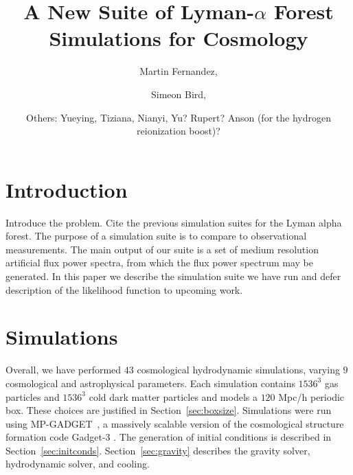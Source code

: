 \documentclass[a4paper,11pt]{article}
\title{A New Suite of Lyman-$\alpha$ Forest Simulations for Cosmology}
\author[a,1]{Martin Fernandez,\note{Corresponding author}}
\author[a]{Simeon Bird,}
\affiliation[a]{Department of Physics \& Astronomy, University of California  Riverside,\\900 University Avenue, Riverside, CA 92521, USA}
\author[b]{Others: Yueying, Tiziana, Nianyi, Yu? Rupert? Anson (for the hydrogen reionization boost)?}
\newcommand{\mpgadget}{{\small MP-GADGET}}
\begin{document}
\maketitle

\section{Introduction}

Introduce the problem. Cite the previous simulation suites for the Lyman alpha forest. The purpose of a simulation suite is to compare to observational measurements. The main output of our suite is a set of medium resolution artificial flux power spectra, from which the flux power spectrum may be generated. In this paper we describe the simulation suite we have run and defer description of the likelihood function to upcoming work.

\cite{Puchwein:2022}

\section{Simulations}

Overall, we have performed $43$ cosmological hydrodynamic simulations, varying $9$ cosmological and astrophysical parameters. Each simulation contains $1536^3$ gas particles and $1536^3$ cold dark matter particles and models a $120$ Mpc/h periodic box. These choices are justified in Section~\ref{sec:boxsize}. Simulations were run using \mpgadget~\cite{MPGadget2018, Bird:2022}, a massively scalable version of the cosmological structure formation code Gadget-3 \cite{Springel:2005}. The generation of initial conditions is described in Section~\ref{sec:initconds}. Section~\ref{sec:gravity} describes the gravity solver, hydrodynamic solver, and cooling.
\end{document}
